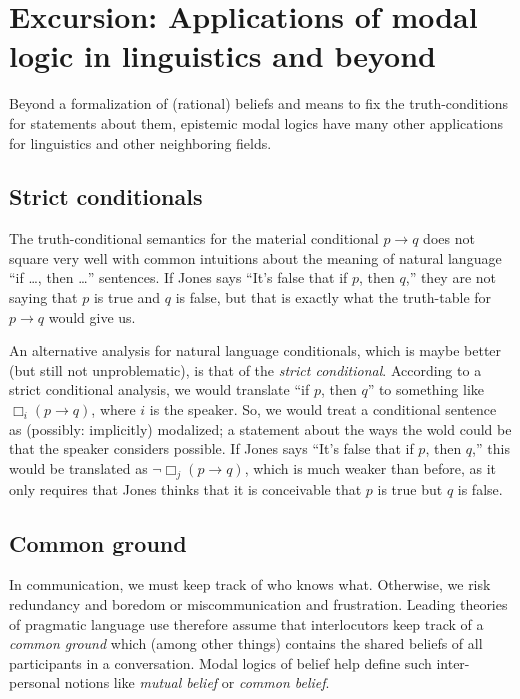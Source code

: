 \documentclass[nobib,nofonts]{tufte-handout}
\begin{document}
\section{Excursion: Applications of modal logic in linguistics and beyond}

Beyond a formalization of (rational) beliefs and means to fix the truth-conditions for statements about them, epistemic modal logics have many other applications for linguistics and other neighboring fields.

\subsection{Strict conditionals}

The truth-conditional semantics for the material conditional $p \rightarrow q$ does not square very well with common intuitions about the meaning of natural language ``if \dots, then \dots'' sentences.
If Jones says ``It's false that if $p$, then $q$,'' they are not saying that $p$ is true and $q$ is false, but that is exactly what the truth-table for $p \rightarrow q$ would give us.

An alternative analysis for natural language conditionals, which is maybe better (but still not unproblematic), is that of the \emph{strict conditional}.
According to a strict conditional analysis, we would translate ``if $p$, then $q$'' to something like $\Box_{i}(p \rightarrow q)$, where $i$ is the speaker.
So, we would treat a conditional sentence as (possibly: implicitly) modalized; a statement about the ways the wold could be that the speaker considers possible.
If Jones says ``It's false that if $p$, then $q$,'' this would be translated as $\neg \Box_{j}(p \rightarrow q)$, which is much weaker than before, as it only requires that Jones thinks that it is conceivable that $p$ is true but $q$ is false.

\subsection{Common ground}

In communication, we must keep track of who knows what.
Otherwise, we risk redundancy and boredom or miscommunication and frustration.
Leading theories of pragmatic language use therefore assume that interlocutors keep track of a \emph{common ground} which (among other things) contains the shared beliefs of all participants in a conversation.
Modal logics of belief help define such inter-personal notions like \emph{mutual belief} or \emph{common belief}.
\end{document}
